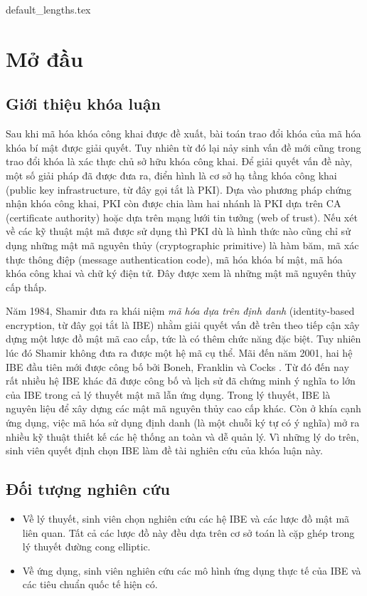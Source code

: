 \documentclass[class=report, crop=false]{standalone}
\begin{document}
	{default_lengths.tex}
	\chapter{Mở đầu}
	\section{Giới thiệu khóa luận}
		Sau khi mã hóa khóa công khai được đề xuất, bài toán trao đổi khóa của mã hóa khóa bí mật được giải quyết. Tuy nhiên từ đó lại nảy sinh vấn đề mới cũng trong trao đổi khóa là xác thực chủ sở hữu khóa công khai. Để giải quyết vấn đề này, một số giải pháp đã được đưa ra, điển hình là cơ sở hạ tầng khóa công khai (public key infrastructure, từ đây gọi tắt là PKI). Dựa vào phương pháp chứng nhận khóa công khai, PKI còn được chia làm hai nhánh là PKI dựa trên CA (certificate authority) hoặc dựa trên mạng lưới tin tưởng (web of trust). Nếu xét về các kỹ thuật mật mã được sử dụng thì PKI dù là hình thức nào cũng chỉ sử dụng những mật mã nguyên thủy (cryptographic primitive) là hàm băm, mã xác thực thông điệp (message authentication code), mã hóa khóa bí mật, mã hóa khóa công khai và chữ ký điện tử. Đây được xem là những mật mã nguyên thủy cấp thấp.

		Năm 1984, Shamir \cite{DBLP:conf/crypto/Shamir84} đưa ra khái niệm \textit{mã hóa dựa trên định danh} (identity-based encryption, từ đây gọi tắt là IBE) nhằm giải quyết vấn đề trên theo tiếp cận xây dựng một lược đồ mật mã cao cấp, tức là có thêm chức năng đặc biệt. Tuy nhiên lúc đó Shamir không đưa ra được một hệ mã cụ thể. Mãi đến năm 2001, hai hệ IBE đầu tiên mới được công bố bởi Boneh, Franklin \cite{DBLP:conf/crypto/BonehF01} và Cocks \cite{DBLP:conf/ima/Cocks01}. Từ đó đến nay rất nhiều hệ IBE khác đã được công bố và lịch sử đã chứng minh ý nghĩa to lớn của IBE trong cả lý thuyết mật mã lẫn ứng dụng. Trong lý thuyết, IBE là nguyên liệu để xây dựng các mật mã nguyên thủy cao cấp khác. Còn ở khía cạnh ứng dụng, việc mã hóa sử dụng định danh (là một chuỗi ký tự có ý nghĩa) mở ra nhiều kỹ thuật thiết kế các hệ thống an toàn và dễ quản lý. Vì những lý do trên, sinh viên quyết định chọn IBE làm đề tài nghiên cứu của khóa luận này.
	\section{Đối tượng nghiên cứu}
		\begin{itemize}
			\item Về lý thuyết, sinh viên chọn nghiên cứu các hệ IBE và các lược đồ mật mã liên quan. Tất cả các lược đồ này đều dựa trên cơ sở toán là cặp ghép trong lý thuyết đường cong elliptic.
			\item Về ứng dụng, sinh viên nghiên cứu các mô hình ứng dụng thực tế của IBE và các tiêu chuẩn quốc tế hiện có.
		\end{itemize}
\end{document}
